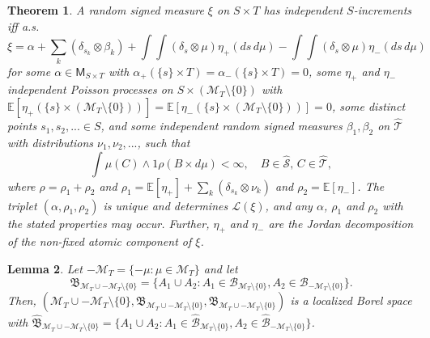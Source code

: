 \documentclass{article}
\theoremstyle{plain}
\newtheorem{theorem}{Theorem}[section]
\newtheorem{lemma}[theorem]{Lemma}
\theoremstyle{remark}
\begin{document}
\begin{theorem}\label{thm-ultra-representation}
	A random signed measure $\xi$ on $S\times T$ has independent $S$-increments iff a.s.
	\begin{equation}\label{representation-ultra}
		\xi=\alpha+\sum_{k}(\delta_{s_k}\otimes\beta_k)+\int\int (\delta_s\otimes\mu)\eta_+(ds\,d\mu)-\int\int (\delta_s\otimes\mu)\eta_-(ds\,d\mu)
	\end{equation}
	for some $\alpha\in\mathsf{M}_{S\times T}$ with $\alpha_+(\{s\}\times T)=\alpha_-(\{s\}\times T)=0$, some $\eta_+$ and $\eta_-$ independent Poisson processes on $S\times(\mathcal{M}_T\setminus\{0\})$ with $\mathbb{E}[\eta_+(\{s\}\times (\mathcal{M}_T\setminus\{0\}))]=\mathbb{E}[\eta_-(\{s\}\times (\mathcal{M}_T\setminus\{0\}))]=0$, some distinct points $s_1,s_2,...\in S$, and some independent random signed measures $\beta_1,\beta_2$ on $\hat{\mathcal{T}}$ with distributions $\nu_1, \nu_2,... $, such that
	\begin{equation*}
		\int\mu(C)\wedge 1 \rho(B\times d\mu)<\infty,\quad B\in\hat{\mathcal{S}},\, C\in\hat{\mathcal{T}},
	\end{equation*}
	where $\rho=\rho_1+\rho_2$ and $\rho_1=\mathbb{E}[\eta_+]+\sum_{k}(\delta_{s_k}\otimes\nu_{k})$ and $\rho_2=\mathbb{E}[\eta_-]$. The triplet $(\alpha,\rho_1,\rho_2)$ is unique and determines $\mathcal{L}(\xi)$, and any $\alpha$, $\rho_1$ and $\rho_2$ with the stated properties may occur. Further, $\eta_+$ and $\eta_-$ are the Jordan decomposition of the non-fixed atomic component of $\xi$.
\end{theorem}

\begin{lemma}\label{lem-Borel-disjoint-union}
	Let $-\mathcal{M}_T=\{-\mu:\mu\in\mathcal{M}_T\}$ and let 
	\begin{equation*}
		\mathfrak{B}_{ \mathcal{M}_T\cup-\mathcal{M}_T\setminus\{0\} }=\{A_1\cup A_2:A_1\in \mathcal{B}_{\mathcal{M}_T\setminus\{0\}},A_2 \in\mathcal{B}_{-\mathcal{M}_T\setminus\{0\}}\}.
	\end{equation*}
	Then, $( \mathcal{M}_T\cup-\mathcal{M}_T\setminus\{0\},\mathfrak{B}_{ \mathcal{M}_T\cup-\mathcal{M}_T\setminus\{0\} },\hat{\mathfrak{B}}_{ \mathcal{M}_T\cup-\mathcal{M}_T\setminus\{0\} } )$ is a localized Borel space with $\hat{\mathfrak{B}}_{ \mathcal{M}_T\cup-\mathcal{M}_T\setminus\{0\} }=\{A_1\cup A_2:A_1\in \hat{\mathcal{B}}_{\mathcal{M}_T\setminus\{0\}},A_2 \in\hat{\mathcal{B}}_{-\mathcal{M}_T\setminus\{0\}}\}$.
\end{lemma}
\end{document}
